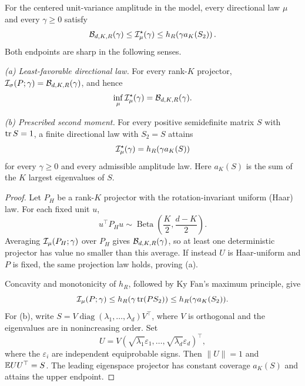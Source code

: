 \begin{theorem}\label{thm:sandwich}
For the centered unit-variance amplitude in the model, every directional law $\mu$ and every $\gamma\ge0$ satisfy
\begin{equation}
\mathcal B_{d,K,R}(\gamma)\le\mathcal I_\mu^\star(\gamma)
\le h_R\!\left(\gamma a_K(S_2)\right).
\label{eq:sandwich}
\end{equation}
Both endpoints are sharp in the following senses.

\emph{(a) Least-favorable directional law.} For every rank-$K$ projector, $\mathcal I_\sigma(P;\gamma)=\mathcal B_{d,K,R}(\gamma)$, and hence
\begin{equation}
\inf_\mu\mathcal I_\mu^\star(\gamma)=\mathcal B_{d,K,R}(\gamma).
\end{equation}

\emph{(b) Prescribed second moment.} For every positive semidefinite matrix $S$ with $\operatorname{tr} S=1$, a finite directional law with $S_2=S$ attains
\begin{equation}
\mathcal I_\mu^\star(\gamma)=h_R(\gamma a_K(S))
\end{equation}
for every $\gamma\ge0$ and every admissible amplitude law. Here $a_K(S)$ is the sum of the $K$ largest eigenvalues of $S$.
\end{theorem}
\begin{proof}
Let $P_H$ be a rank-$K$ projector with the rotation-invariant uniform (Haar) law. For each fixed unit $u$,
\begin{equation}
u^{\top}P_Hu\sim\operatorname{Beta}\!\left(\frac K2,\frac{d-K}{2}\right).
\label{eq:beta}
\end{equation}
Averaging $\mathcal I_\mu(P_H;\gamma)$ over $P_H$ gives $\mathcal B_{d,K,R}(\gamma)$, so at least one deterministic projector has value no smaller than this average. If instead $U$ is Haar-uniform and $P$ is fixed, the same projection law holds, proving (a).

Concavity and monotonicity of $h_R$, followed by Ky Fan's maximum principle, give
\begin{equation}
\mathcal I_\mu(P;\gamma)\le h_R(\gamma\operatorname{tr}(PS_2))
\le h_R(\gamma a_K(S_2)).
\label{eq:jensen}
\end{equation}
For (b), write $S=V\operatorname{diag}(\lambda_1,\ldots,\lambda_d)V^{\top}$, where $V$ is orthogonal and the eigenvalues are in nonincreasing order. Set
\begin{equation}
U=V(\sqrt{\lambda_1}\varepsilon_1,\ldots,\sqrt{\lambda_d}\varepsilon_d)^{\top},
\end{equation}
where the $\varepsilon_i$ are independent equiprobable signs. Then $\|U\|=1$ and $\mathbb E UU^{\top}=S$. The leading eigenspace projector has constant coverage $a_K(S)$ and attains the upper endpoint.
\end{proof}

